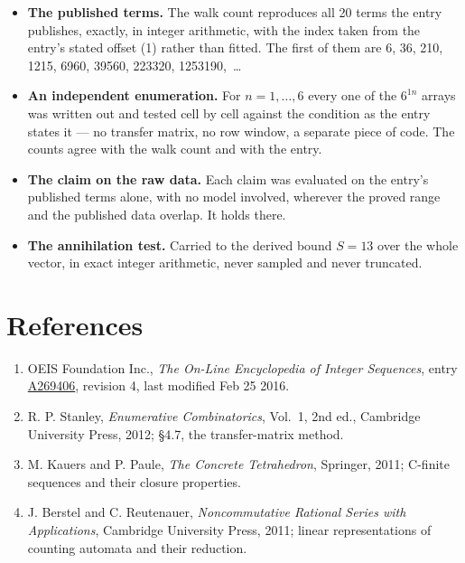 \documentclass[11pt]{article}
\theoremstyle{definition}
\begin{document}
\begin{itemize}

\item {\bfseries The published terms.} The walk count reproduces all 20 terms the entry publishes, exactly, in integer arithmetic, with the index taken from the entry's stated offset (1) rather than fitted. The first of them are 6, 36, 210, 1215, 6960, 39560, 223320, 1253190,~\dots

\item {\bfseries An independent enumeration.} For $n = 1,\dots,6$ every one of the $6^{1n}$ arrays was written out and tested cell by cell against the condition as the entry states it --- no transfer matrix, no row window, a separate piece of code. The counts agree with the walk count and with the entry.

\item {\bfseries The claim on the raw data.} Each claim was evaluated on the entry's published terms alone, with no model involved, wherever the proved range and the published data overlap. It holds there.

\item {\bfseries The annihilation test.} Carried to the derived bound $S = 13$ over the whole vector, in exact integer arithmetic, never sampled and never truncated.

\end{itemize}

\section{References}

\begin{enumerate}

\item OEIS Foundation Inc., \emph{The On-Line Encyclopedia of Integer Sequences}, entry \href{https://oeis.org/A269406}{A269406}, revision 4, last modified Feb 25 2016.

\item R. P. Stanley, \emph{Enumerative Combinatorics}, Vol.~1, 2nd ed., Cambridge University Press, 2012; \S4.7, the transfer-matrix method.

\item M. Kauers and P. Paule, \emph{The Concrete Tetrahedron}, Springer, 2011; C-finite sequences and their closure properties.

\item J. Berstel and C. Reutenauer, \emph{Noncommutative Rational Series with Applications}, Cambridge University Press, 2011; linear representations of counting automata and their reduction.

\end{enumerate}
\end{document}
